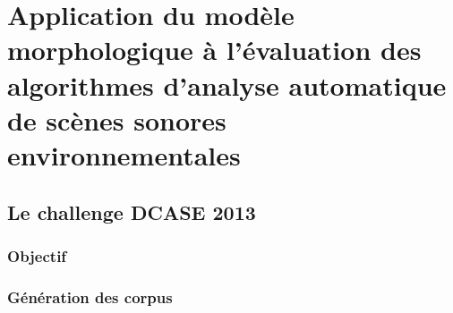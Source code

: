\chapter[Application du modèle à l'évaluation]{Application du modèle morphologique à l'évaluation des algorithmes d'analyse automatique de scènes sonores environnementales}\label{ch:ml_simuperf}

\section{Le challenge DCASE  2013}

\subsection{Objectif}


\subsection{Génération des corpus}

